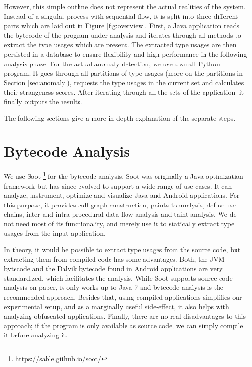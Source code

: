 However, this simple outline does not represent the actual realities of the system.
Instead of a singular process with sequential flow, it is split into three different parts which are laid out in Figure \ref{fig:overview}.
First, a Java application reads the bytecode of the program under analysis and iterates through all methods to extract the type usages which are present.
The extracted type usages are then persisted in a database to ensure flexibility and high performance in the following analysis phase.
For the actual anomaly detection, we use a small Python program.
It goes through all partitions of type usages (more on the partitions in Section \ref{sec:anomaly}), requests the type usages in the current set and calculates their strangeness scores.
After iterating through all the sets of the application, it finally outputs the results.

The following sections give a more in-depth explanation of the separate steps.

\section{Bytecode Analysis}\label{sec:bytecode}

We use Soot \footnote{\url{https://sable.github.io/soot/}} for the bytecode analysis.
Soot was originally a Java optimization framework but has since evolved to support a wide range of use cases.
It can analyze, instrument, optimize and visualize Java and Android applications.
For this purpose, it provides call graph construction, points-to analysis, def or use chains, inter and intra-procedural data-flow analysis and taint analysis.
We do not need most of its functionality, and merely use it to statically extract type usages from the input application.

In theory, it would be possible to extract type usages from the source code, but extracting them from compiled code has some advantages.
Both, the JVM bytecode and the Dalvik bytecode found in Android applications are very standardized, which facilitates the analysis.
While Soot supports source code analysis on paper, it only works up to Java 7 and bytecode analysis is the recommended approach.
Besides that, using compiled applications simplifies our experimental setup, and as a marginally useful side-effect, it also helps with analyzing obfuscated applications.
Finally, there are no real disadvantages to this approach; if the program is only available as source code, we can simply compile it before analyzing it.

